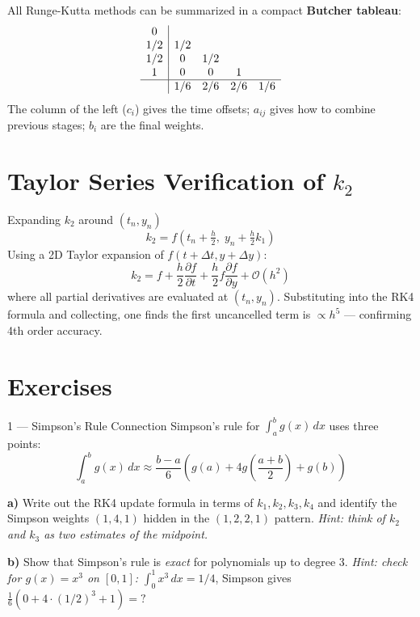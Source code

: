 \documentclass[12pt, a4paper]{article}
\begin{document}
All Runge-Kutta methods can be summarized in a compact \textbf{Butcher tableau}:
\[
\begin{array}{c|cccc}
0   &      &     &     &   \\
1/2 & 1/2  &     &     &   \\
1/2 &  0   & 1/2 &     &   \\
1   &  0   &  0  &  1  &   \\
\hline
    & 1/6  & 2/6 & 2/6 & 1/6
\end{array}
\]
The column of the left ($c_i$) gives the time offsets; $a_{ij}$ gives how to combine previous stages; $b_i$ are the final weights.

\section{Taylor Series Verification of $k_2$}

\begin{theorybox}{Expanding $k_2$ around $(t_n, y_n)$}
\[
  k_2 = f\!\left(t_n + \tfrac{h}{2},\; y_n + \tfrac{h}{2}k_1\right)
\]
Using a 2D Taylor expansion of $f(t+\Delta t, y+\Delta y)$:
\[
  k_2 = f + \frac{h}{2}\frac{\partial f}{\partial t} + \frac{h}{2}f\frac{\partial f}{\partial y} + \mathcal{O}(h^2)
\]
where all partial derivatives are evaluated at $(t_n, y_n)$.
Substituting into the RK4 formula and collecting, one finds the first uncancelled term is $\propto h^5$ — confirming 4th order accuracy.
\end{theorybox}

\section{Exercises}

\begin{exercisebox}{1 — Simpson's Rule Connection}
Simpson's rule for $\int_a^b g(x)\,dx$ uses three points:
\[
  \int_a^b g(x)\,dx \approx \frac{b-a}{6}\left(g(a) + 4g\!\left(\frac{a+b}{2}\right) + g(b)\right)
\]

\textbf{a)} Write out the RK4 update formula in terms of $k_1, k_2, k_3, k_4$ and identify
the Simpson weights $(1, 4, 1)$ hidden in the $(1, 2, 2, 1)$ pattern.
\textit{Hint: think of $k_2$ and $k_3$ as two estimates of the midpoint.}

\textbf{b)} Show that Simpson's rule is \textit{exact} for polynomials up to degree 3.
\textit{Hint: check for $g(x) = x^3$ on $[0,1]$:}
$\int_0^1 x^3\,dx = 1/4$, \; Simpson gives $\frac{1}{6}(0 + 4\cdot(1/2)^3 + 1) = ?$
\end{exercisebox}
\end{document}
